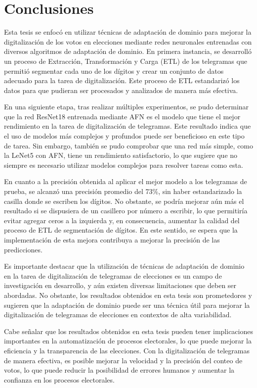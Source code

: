 \chapter{Conclusiones}

\label{Chapter5}

Esta tesis se enfocó en utilizar técnicas de adaptación de dominio para mejorar la digitalización de los votos en
elecciones mediante redes neuronales entrenadas con diversos algoritmos de adaptación de dominio. En primera instancia,
se desarrolló un proceso de Extracción, Transformación y Carga (ETL) de los telegramas que permitió segmentar cada uno
de los dígitos y crear un conjunto de datos adecuado para la tarea de digitalización. Este proceso de ETL estandarizó
los datos para que pudieran ser procesados y analizados de manera más efectiva.

En una siguiente etapa, tras realizar múltiples experimentos, se pudo determinar que la red ResNet18 entrenada mediante
AFN es el modelo que tiene el mejor rendimiento en la tarea de digitalización de telegramas. Este resultado indica que
el uso de modelos más complejos y profundos puede ser beneficioso en este tipo de tarea. Sin embargo, también se pudo
comprobar que una red más simple, como la LeNet5 con AFN, tiene un rendimiento satisfactorio, lo que sugiere que no
siempre es necesario utilizar modelos complejos para resolver tareas como esta.

En cuanto a la precisión obtenida al aplicar el mejor modelo a los telegramas de prueba, se alcanzó una precisión
promedio del 73\%, sin haber estandarizado la casilla donde se escriben los dígitos. No obstante, se podría mejorar aún
más el resultado si se dispusiera de un casillero por número a escribir, lo que permitiría evitar agregar ceros a la
izquierda y, en consecuencia, aumentar la calidad del proceso de ETL de segmentación de dígitos. En este sentido, se
espera que la implementación de esta mejora contribuya a mejorar la precisión de las predicciones.

Es importante destacar que la utilización de técnicas de adaptación de dominio en la tarea de digitalización de
telegramas de elecciones es un campo de investigación en desarrollo, y aún existen diversas limitaciones que deben ser
abordadas. No obstante, los resultados obtenidos en esta tesis son prometedores y sugieren que la adaptación de dominio
puede ser una técnica útil para mejorar la digitalización de telegramas de elecciones en contextos de alta
variabilidad.

Cabe señalar que los resultados obtenidos en esta tesis pueden tener implicaciones importantes en la automatización de
procesos electorales, lo que puede mejorar la eficiencia y la transparencia de las elecciones. Con la digitalización de
telegramas de manera efectiva, es posible mejorar la velocidad y la precisión del conteo de votos, lo que puede reducir
la posibilidad de errores humanos y aumentar la confianza en los procesos electorales.

